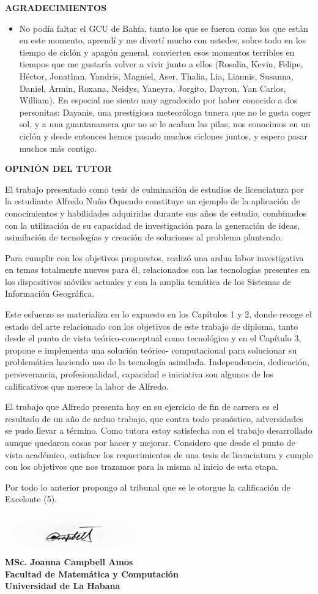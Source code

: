 \documentclass[12pt, a4paper]{book}
\newenvironment{opiniontutor}
{
  \cleardoublepage
  \thispagestyle{empty}
  \begin{center}
    {\LARGE\bfseries OPINIÓN DEL TUTOR} \\[1.5cm] %
  \end{center}
  \setlength{\parskip}{1em} %
}
{
  \vspace{3cm} %
  \begin{flushright}
    \includegraphics[width=6cm]{images/firma_tutor.png} \\ %
    \vspace{0.5cm} %
    \textbf{MSc. Joanna Campbell Amos} \\
    \textbf{Facultad de Matemática y Computación} \\
    \textbf{Universidad de La Habana}
  \end{flushright}
}
\newenvironment{agradecimientos}{
  \clearpage %
  \thispagestyle{empty} %
  \begin{center}
    {\LARGE\bfseries AGRADECIMIENTOS} \\[1.5cm]
  \end{center}
  \setlength{\parindent}{0pt} %
  \setlength{\parskip}{1em} %
}{
  \vspace*{\fill} %
  \newpage %
}
\let\cleardoublepage\clearpage %
\begin{document}
\begin{agradecimientos}
\begin{itemize}
    \item No podía faltar el GCU de Bahía, tanto los que se fueron como los que están en este momento, aprendí y me divertí mucho con ustedes, sobre todo en los tiempo de ciclón y apagón general, convierten esos momentos terribles en tiempos que me gustaría volver a vivir junto a ellos (Rosalia, Kevin, Felipe, Héctor, Jonathan, Yandris, Magniel, Aser, Thalia, Lia, Liannis, Susanna, Daniel, Armin, Roxana, Neidys, Yaneyra, Jorgito, Dayron, Yan Carlos, William). En especial me siento muy agradecido por haber conocido a dos personitas: Dayanis, una prestigiosa meteoróloga tunera que no le gusta coger sol, y a una guantanamera que no se le acaban las pilas, nos conocimos en un ciclón y desde entonces hemos pasado muchos ciclones juntos, y espero pasar muchos más contigo.
  \end{itemize}
  
  \end{agradecimientos}

\begin{opiniontutor}
  El trabajo presentado como tesis de culminación de estudios de licenciatura por la estudiante Alfredo Nuño Oquendo  constituye un ejemplo de la aplicación de conocimientos y habilidades adquiridas durante sus años de estudio, combinados con la utilización de su capacidad de investigación para la generación de ideas, asimilación de tecnologías y creación de soluciones al problema planteado.

  Para cumplir con los objetivos propuestos, realizó una ardua labor investigativa en temas totalmente nuevos para él, relacionados con las tecnologías presentes en los dispositivos móviles actuales y con la amplia temática de los Sistemas de Información Geográfica.

  Este esfuerzo se materializa en lo expuesto en los Capítulos 1 y 2, donde recoge el estado del arte relacionado con los objetivos de este trabajo de diploma, tanto desde el punto de vista teórico-conceptual como tecnológico y en el Capítulo 3, propone e implementa  una solución teórico- computacional  para solucionar su problemática haciendo uso de la tecnología asimilada. Independencia, dedicación, perseverancia, profesionalidad, capacidad e iniciativa son algunos de los calificativos que merece la labor de Alfredo.

  El trabajo que Alfredo presenta hoy en su ejercicio de fin de carrera es el resultado de un año  de arduo trabajo, que contra todo pronóstico, adversidades se pudo llevar a término.  Como tutora estoy satisfecha con el trabajo desarrollado aunque quedaron cosas por hacer  y mejorar. Considero que desde el punto de vista académico, satisface los requerimientos de una tesis de licenciatura y cumple con los objetivos que nos trazamos para la misma al inicio de esta etapa.

  Por todo lo anterior propongo al tribunal que se le otorgue la calificación de Excelente (5).

\end{opiniontutor}
\end{document}
